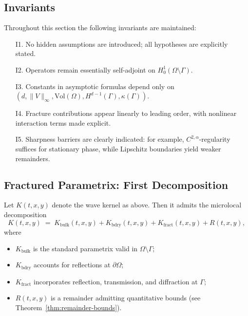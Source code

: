 \subsection*{Invariants}

Throughout this section the following invariants are maintained:

\begin{itemize}
  \item[I1.] No hidden assumptions are introduced; all hypotheses are explicitly stated. 
  \item[I2.] Operators remain essentially self-adjoint on $H^1_0(\Omega \setminus \Gamma)$. 
  \item[I3.] Constants in asymptotic formulas depend only on $(d,\|V\|_\infty, \mathrm{Vol}(\Omega), H^{d-1}(\Gamma), \kappa(\Gamma))$. 
  \item[I4.] Fracture contributions appear linearly to leading order, with nonlinear interaction terms made explicit. 
  \item[I5.] Sharpness barriers are clearly indicated: for example, $C^{2,\alpha}$-regularity suffices for stationary phase, while Lipschitz boundaries yield weaker remainders. 
\end{itemize}

\subsection{Fractured Parametrix: First Decomposition}

\begin{proposition}[Decomposition]
\label{prop:fractured-decomposition}
Let $K(t,x,y)$ denote the wave kernel as above. Then it admits the microlocal decomposition
\[
K(t,x,y) \;=\; K_{\mathrm{bulk}}(t,x,y) + K_{\mathrm{bdry}}(t,x,y) + K_{\mathrm{fract}}(t,x,y) + R(t,x,y),
\]
where 
\begin{itemize}
  \item $K_{\mathrm{bulk}}$ is the standard parametrix valid in $\Omega \setminus \Gamma$;
  \item $K_{\mathrm{bdry}}$ accounts for reflections at $\partial\Omega$;
  \item $K_{\mathrm{fract}}$ incorporates reflection, transmission, and diffraction at $\Gamma$;
  \item $R(t,x,y)$ is a remainder admitting quantitative bounds (see Theorem~\ref{thm:remainder-bounds}). 
\end{itemize}
\end{proposition}

